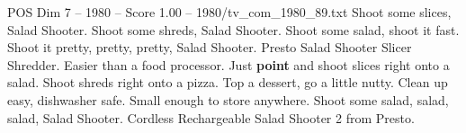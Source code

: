 \begin{textsample}{POS Dim 7 – 1980 – Score 1.00 – 1980/tv\_com\_1980\_89.txt}  \label{ex:f7_pos_045}
Shoot some slices, Salad Shooter.
Shoot some shreds, Salad Shooter.
Shoot some salad, shoot it fast.
Shoot it pretty, pretty, pretty, Salad Shooter.
Presto Salad Shooter Slicer Shredder.
Easier than a food processor.
Just \textbf{point} and shoot slices right onto a salad.
Shoot shreds right onto a pizza.
Top a dessert, go a little nutty.
Clean up easy, dishwasher safe.
Small enough to store anywhere.
Shoot some salad, salad, salad, Salad Shooter.
Cordless Rechargeable Salad Shooter 2 from Presto.

\end{textsample}
